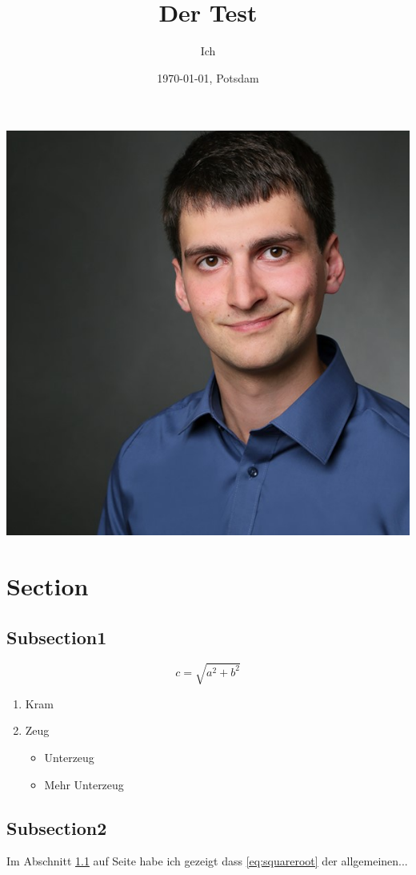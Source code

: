 \documentclass[a4paper,12pt]{article}
\title{Der Test}
\author{Ich}
\date{\today{}, Potsdam}
\begin{document}
\maketitle 
\newpage 
\tableofcontents
\newpage
\begin{flushright}
\includegraphics[scale=0.2]{Kemter} 
\end{flushright}



\section{Section}
\label{sec:Ober}
\subsection{Subsection1}
\label{sec:Unter1}

\begin{center}
	\begin{equation}
  	\label{eq:squareroot}
  	c = \sqrt{ a^{2} + b^{2} }
	\end{equation}
\end{center}



\begin{enumerate}
\item Kram
\item Zeug
	\begin{itemize}
	\item Unterzeug
	\item Mehr Unterzeug
	\end{itemize}
\end{enumerate}

\subsection{Subsection2}
\label{sec:Unter2}
Im Abschnitt \ref{sec:Unter1} auf Seite \pageref{sec:Unter1} habe ich
gezeigt dass \eqref{eq:squareroot} der allgemeinen...
\end{document}
